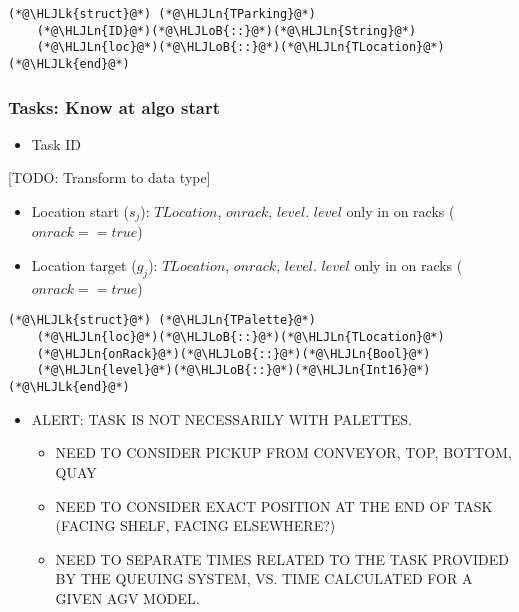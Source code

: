 \documentclass[12pt,a4paper]{article}
\newcommand{\HLJLk}[1]{\textcolor[RGB]{148,91,176}{\textbf{#1}}}
\newcommand{\HLJLn}[1]{#1}
\newcommand{\HLJLoB}[1]{\textcolor[RGB]{102,102,102}{\textbf{#1}}}
\begin{document}
\begin{lstlisting}
(*@\HLJLk{struct}@*) (*@\HLJLn{TParking}@*)
    (*@\HLJLn{ID}@*)(*@\HLJLoB{::}@*)(*@\HLJLn{String}@*)
    (*@\HLJLn{loc}@*)(*@\HLJLoB{::}@*)(*@\HLJLn{TLocation}@*)
(*@\HLJLk{end}@*)
\end{lstlisting}


\subsubsection{Tasks: Know at algo start}
\begin{itemize}
\item Task ID

\end{itemize}
[TODO: Transform to data type]

\begin{itemize}
\item Location start ($s_j$): $TLocation$, $onrack$, $level$. $level$ only in on racks ($onrack == true$)


\item Location target ($g_j$): $TLocation$, $onrack$, $level$. $level$ only in on racks ($onrack == true$)

\end{itemize}

\begin{lstlisting}
(*@\HLJLk{struct}@*) (*@\HLJLn{TPalette}@*)
    (*@\HLJLn{loc}@*)(*@\HLJLoB{::}@*)(*@\HLJLn{TLocation}@*)
    (*@\HLJLn{onRack}@*)(*@\HLJLoB{::}@*)(*@\HLJLn{Bool}@*)
    (*@\HLJLn{level}@*)(*@\HLJLoB{::}@*)(*@\HLJLn{Int16}@*)
(*@\HLJLk{end}@*)
\end{lstlisting}


\begin{itemize}
\item ALERT: TASK IS NOT NECESSARILY WITH PALETTES.

\begin{itemize}
\item NEED TO CONSIDER PICKUP FROM CONVEYOR, TOP, BOTTOM, QUAY


\item NEED TO CONSIDER EXACT POSITION AT THE END OF TASK (FACING SHELF, FACING ELSEWHERE?)


\item NEED TO SEPARATE TIMES RELATED TO THE TASK PROVIDED BY THE QUEUING SYSTEM, VS. TIME CALCULATED FOR A GIVEN AGV MODEL.

\end{itemize}
\end{itemize}
\end{document}
